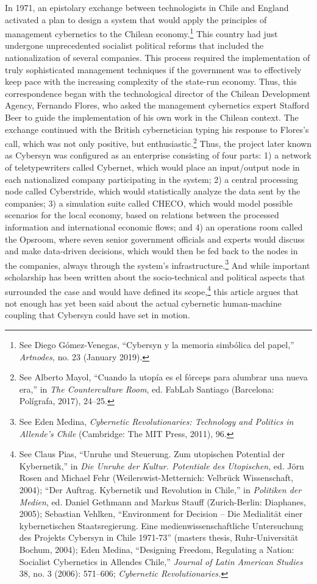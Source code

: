 \documentclass{tufte-handout}
\begin{document}
In 1971, an epistolary exchange between technologists in Chile and
England activated a plan to design a system that would apply the
principles of management cybernetics to the Chilean economy.\footnote{See
  Diego Gómez-Venegas, ``Cybersyn y la memoria simbólica del papel,''
  \emph{Artnodes,} no. 23 (January 2019).} This country had just
undergone unprecedented socialist political reforms that included the
nationalization of several companies. This process required the
implementation of truly sophisticated management techniques if the
government was to effectively keep pace with the increasing complexity
of the state-run economy. Thus, this correspondence began with the
technological director of the Chilean Development Agency, Fernando
Flores, who asked the management cybernetics expert Stafford Beer to
guide the implementation of his own work in the Chilean context. The
exchange continued with the British cybernetician typing his response to
Flores's call, which was not only positive, but enthusiastic.\footnote{See
  Alberto Mayol, ``Cuando la utopía es el fórceps para alumbrar una
  nueva era,'' in \emph{The Counterculture Room}, ed. FabLab Santiago
  (Barcelona: Polígrafa, 2017), 24--25.} Thus, the project later known
as Cybersyn was configured as an enterprise consisting of four parts: 1)
a network of teletypewriters called Cybernet, which would place an
input/output node in each nationalized company participating in the
system; 2) a central processing node called Cyberstride, which would
statistically analyze the data sent by the companies; 3) a simulation
suite called CHECO, which would model possible scenarios for the local
economy, based on relations between the processed information and
international economic flows; and 4) an operations room called the
Opsroom, where seven senior government officials and experts would
discuss and make data-driven decisions, which would then be fed back to
the nodes in the companies, always through the system's
infrastructure.\footnote{See Eden Medina, \emph{Cybernetic
  Revolutionaries: Technology and Politics in Allende's Chile}
  (Cambridge: The MIT Press, 2011), 96.} And while important scholarship
has been written about the socio-technical and political aspects that
surrounded the case and would have defined its scope,\footnote{See Claus
  Pias, ``Unruhe und Steuerung. Zum utopischen Potential der
  Kybernetik,'' in \emph{Die Unruhe der Kultur. Potentiale des
  Utopischen}, ed. Jörn Rosen and Michael Fehr (Weilerswist-Metternich:
  Velbrück Wissenschaft, 2004); ``Der Auftrag. Kybernetik und Revolution
  in Chile,'' in \emph{Politiken der Medien}, ed. Daniel Gethmann and
  Markus Stauff (Zurich-Berlin: Diaphanes, 2005); Sebastian Vehlken,
  ``Environment for Decision -- Die Medialität einer kybernetischen
  Staatsregierung. Eine medienwissenschaftliche Untersuchung des
  Projekts Cybersyn in Chile 1971-73'' (masters thesis,
  Ruhr-Universität Bochum, 2004); Eden Medina, ``Designing Freedom,
  Regulating a Nation: Socialist Cybernetics in Allendes Chile,''
  \emph{Journal of Latin American Studies} 38, no. 3 (2006): 571--606;
  \emph{Cybernetic Revolutionaries.}} this article argues that not
enough has yet been said about the actual cybernetic human-machine
coupling that Cybersyn could have set in motion.
\end{document}
